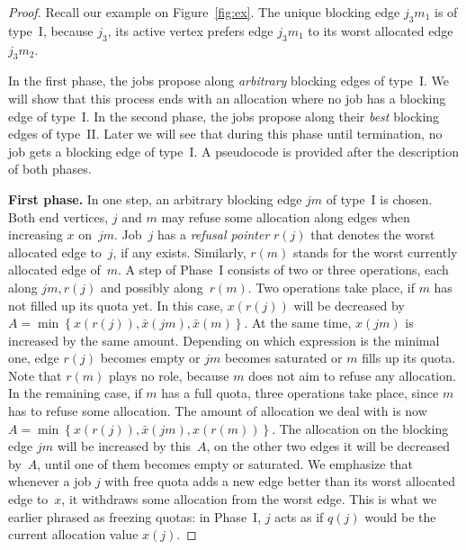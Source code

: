 \documentclass{llncs}
\begin{document}
\begin{proof}

Recall our example on Figure~\ref{fig:ex}. The unique blocking edge $j_3m_1$ is of type~I, because $j_3$, its active vertex prefers edge $j_3m_1$ to its worst allocated edge~$j_3m_2$.

In the first phase, the jobs propose along \textit{arbitrary} blocking edges of type~I. We will show that this process ends with an allocation where no job has a blocking edge of type~I. In the second phase, the jobs propose along their \textit{best} blocking edges of type~II. Later we will see that during this phase until termination, no job gets a blocking edge of type~I. A pseudocode is provided after the description of both phases.

\textbf{First phase. }
In one step, an arbitrary blocking edge $jm$ of type~I is chosen. Both end vertices, $j$ and $m$ may refuse some allocation along edges when increasing $x$ on~$jm$. Job~$j$ has a \emph{refusal pointer} $r(j)$ that denotes the worst allocated edge to~$j$, if any exists. Similarly, $r(m)$ stands for the worst currently allocated edge of~$m$. A step of Phase~I consists of two or three operations, each along $jm, r(j)$ and possibly along~$r(m)$. Two operations take place, if $m$ has not filled up its quota yet. In this case, $x(r(j))$ will be decreased by $A=\min{\left\{x(r(j)), \bar{x}(jm), \bar{x}(m)\right\}}$. At the same time, $x(jm)$ is increased by the same amount. Depending on which expression is the minimal one, edge $r(j)$ becomes empty or $jm$ becomes saturated or $m$ fills up its quota. Note that $r(m)$ plays no role, because $m$ does not aim to refuse any allocation. In the remaining case, if $m$ has a full quota, three operations take place, since $m$ has to refuse some allocation. The amount of allocation we deal with is now $A=\min{\left\{x(r(j)), \bar{x}(jm), x(r(m))\right\}}$. The allocation on the blocking edge $jm$ will be increased by this~$A$, on the other two edges it will be decreased by~$A$, until one of them becomes empty or saturated. We emphasize that whenever a job $j$ with free quota adds a new edge better than its worst allocated edge to~$x$, it withdraws some allocation from the worst edge. This is what we earlier phrased as freezing quotas: in Phase~I, $j$ acts as if $q(j)$ would be the current allocation value $x(j)$.


\end{proof}
\end{document}
